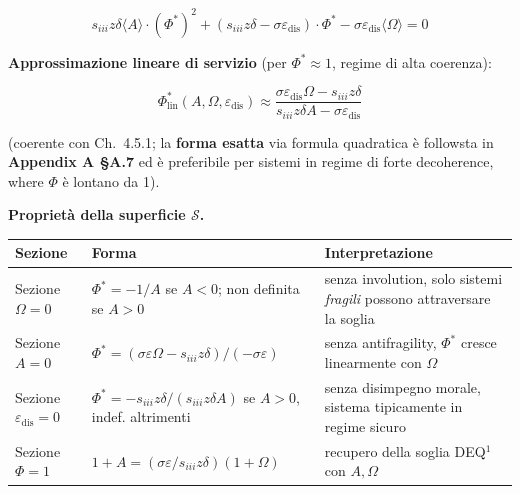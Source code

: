 \[
s_{iii} z \delta \langle A\rangle \cdot (\Phi^*)^2 + (s_{iii} z \delta - \sigma \varepsilon_{\text{dis}}) \cdot \Phi^* - \sigma \varepsilon_{\text{dis}} \langle\Omega\rangle = 0
\]

\Hypoth{} \textbf{Approssimazione lineare di servizio} (per
\(\Phi^* \approx 1\), regime di alta coerenza):

\[
\Phi^*_{\text{lin}}(A, \Omega, \varepsilon_{\text{dis}}) \approx \frac{\sigma \varepsilon_{\text{dis}} \Omega - s_{iii} z \delta}{s_{iii} z \delta A - \sigma \varepsilon_{\text{dis}}}
\]

(coerente con Ch.~4.5.1; la \textbf{forma esatta} via formula
quadratica è followsta in \textbf{Appendix A \S{}A.7} ed è preferibile per
sistemi in regime di forte decoherence, where \(\Phi\) è lontano da 1).

\Proved{} \textbf{Proprietà della superficie \(\mathcal{S}\).}

{\def\LTcaptype{none} %
{\small\begin{longtable}[]{@{}
  >{\raggedright\arraybackslash}p{}
  >{\raggedright\arraybackslash}p{}
  >{\raggedright\arraybackslash}p{}@{}}
\toprule\noalign{}
\begin{minipage}[b]{\linewidth}\raggedright
Sezione
\end{minipage} & \begin{minipage}[b]{\linewidth}\raggedright
Forma
\end{minipage} & \begin{minipage}[b]{\linewidth}\raggedright
Interpretazione
\end{minipage} \\
\midrule\noalign{}
\endhead
\bottomrule\noalign{}
\endlastfoot
Sezione \(\Omega = 0\) & \(\Phi^* = -1/A\) se \(A < 0\); non definita se
\(A > 0\) & senza involution, solo sistemi \emph{fragili} possono
attraversare la soglia \\
Sezione \(A = 0\) &
\(\Phi^* = (\sigma\varepsilon\Omega - s_{iii}z\delta) / (-\sigma\varepsilon)\)
& senza antifragility, \(\Phi^*\) cresce linearmente con \(\Omega\) \\
Sezione \(\varepsilon_{\text{dis}} = 0\) &
\(\Phi^* = -s_{iii}z\delta / (s_{iii}z\delta A)\) se \(A > 0\), indef.
altrimenti & senza disimpegno morale, sistema tipicamente in regime
sicuro \\
Sezione \(\Phi = 1\) &
\(1 + A = (\sigma\varepsilon/s_{iii}z\delta)(1 + \Omega)\) & recupero
della soglia DEQ$^1$ con \(A, \Omega\) \\
\end{longtable}}
}

